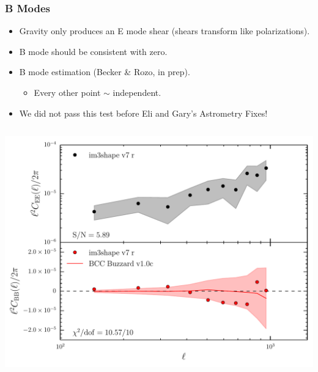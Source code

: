 \documentclass{beamer}
\begin{document}
\frame
{
    \frametitle{B Modes}

    \fontsize{9}{0.8\baselineskip}
    \begin{itemize}

            \item Gravity only produces an E mode shear (shears transform like
                polarizations).

            \item B mode should be consistent with zero.

            \item B mode estimation (Becker \& Rozo, in prep).

                \begin{itemize} 

                        \item Every other point $\sim$ independent.

                \end{itemize} 

            \item We did not pass this test before Eli and Gary's Astrometry Fixes!


    \end{itemize}

    \begin{columns}

        \begin{column}{0.5\textwidth}
            \begin{center}
                \includegraphics[width=1.05\textwidth]{im3shape_v7_r_b.pdf}
            \end{center}
        \end{column}


\end{columns}}
\end{document}
